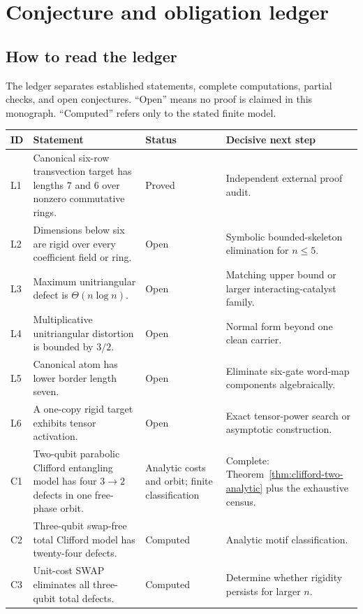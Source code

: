 \chapter{Conjecture and obligation ledger}\label{app:ledger}


\section{How to read the ledger}
The ledger separates established statements, complete computations, partial checks, and open conjectures.  ``Open'' means no proof is claimed in this monograph.  ``Computed'' refers only to the stated finite model.

\begin{longtable}{@{}>{\raggedright\arraybackslash}p{}>{\raggedright\arraybackslash}p{}>{\raggedright\arraybackslash}p{}>{\raggedright\arraybackslash}p{}@{}}
\toprule
ID & Statement & Status & Decisive next step\\
\midrule
L1 & Canonical six-row transvection target has lengths $7$ and $6$ over nonzero commutative rings. & Proved & Independent external proof audit.\\
L2 & Dimensions below six are rigid over every coefficient field or ring. & Open & Symbolic bounded-skeleton elimination for $n\le5$.\\
L3 & Maximum unitriangular defect is $\Theta(n\log n)$. & Open & Matching upper bound or larger interacting-catalyst family.\\
L4 & Multiplicative unitriangular distortion is bounded by $3/2$. & Open & Normal form beyond one clean carrier.\\
L5 & Canonical atom has lower border length seven. & Open & Eliminate six-gate word-map components algebraically.\\
L6 & A one-copy rigid target exhibits tensor activation. & Open & Exact tensor-power search or asymptotic construction.\\
C1 & Two-qubit parabolic Clifford entangling model has four $3\to2$ defects in one free-phase orbit. & Analytic costs and orbit; finite classification & Complete: Theorem~\ref{thm:clifford-two-analytic} plus the exhaustive census.\\
C2 & Three-qubit swap-free total Clifford model has twenty-four defects. & Computed & Analytic motif classification.\\
C3 & Unit-cost SWAP eliminates all three-qubit total defects. & Computed & Determine whether rigidity persists for larger $n$.\\

\end{longtable}
